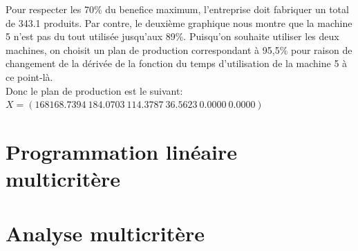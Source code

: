 \documentclass[a4paper, 11pt]{article}
\begin{document}
Pour respecter les 70\% du benefice maximum, l’entreprise doit fabriquer un
total de 343.1 produits. Par contre, le deuxième graphique nous montre que la
machine 5 n’est pas du tout utilisée jusqu’aux 89\%. Puisqu’on souhaite
utiliser les deux machines, on choisit un plan de production correspondant à
95,5\% pour raison de changement de la dérivée de la fonction du temps
d’utilisation de la machine 5 à ce point-là. \\

Donc le plan de production est le suivant: \\
$X = (168 168.7394~ 184.0703~ 114.3787~ 36.5623~ 0.0000~ 0.0000)$

\section{Programmation linéaire multicritère}


\section{Analyse multicritère}

\end{document}
